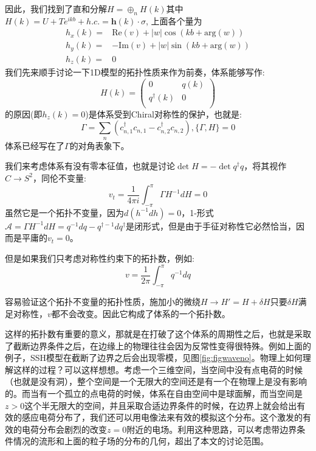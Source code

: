 \documentclass[supercite]{HustGraduPaper}
\begin{document}
因此，我们找到了直和分解$H = \oplus_n H(k)$其中 $H(k) = U + Te^{ikb} + h.c. = \mathbf{h}(k) \cdot \sigma$,
上面各个量为
\begin{equation}
\begin{split}h_x(k)=&\text{Re}(v)+|w|\cos(kb+\text{arg}(w))\\
h_y(k)=&-\text{Im}(v)+|w|\sin(kb+\text{arg}(w))\\
h_z(k)=&0\end{split}
\end{equation}
我们先来顺手讨论一下1D模型的拓扑性质来作为前奏，体系能够写作:
\begin{equation}
H(k) = \left(\begin{matrix}
0 &q(k)\\
q^\dagger(k) & 0\\
\end{matrix}\right)
\end{equation}
的原因(即$h_z(k) = 0$)是体系受到Chiral对称性的保护，也就是:
\begin{equation}
\Gamma = \sum_n(c^\dagger_{n,1}c_{n,1} -c^\dagger_{n,2}c_{n,2}), \{\Gamma,H\} = 0
\end{equation}
体系已经写在了$\Gamma$的对角表象下。

我们来考虑体系有没有零本征值，也就是讨论${\det} H =- \det q^\dagger q$，将其视作$C\to S^2$，同伦不变量:
\begin{equation}
v_t = \frac{1}{4\pi i} \int_{-\pi}^{\pi} \Gamma H^{-1} dH = 0
\end{equation}
虽然它是一个拓扑不变量，因为$d(h^{-1}dh) = 0$，1-形式$\mathcal{A} = \Gamma H^{-1} dH = q^{-1} dq - q^{\dagger -1}dq^\dagger$是闭形式，但是由于手征对称性它必然恰当，因而是平庸的$v_t = 0$。

但是如果我们只考虑对称性约束下的拓扑数\cite{asboth2016short}，例如:
\begin{equation}
v = \frac{1}{2\pi} \int_{-\pi}^\pi q^{-1}dq
\end{equation}

容易验证这个拓扑不变量的拓扑性质，施加小的微绕$H \to H' = H + \delta H$只要$\delta H$满足对称性，$v$都不会改变。因此它构成了体系的一个拓扑数。

这样的拓扑数有重要的意义，那就是在打破了这个体系的周期性之后，也就是采取了截断边界条件之后，在边缘上的物理往往会因为反常性变得很特殊。例如上面的例子，SSH模型在截断了边界之后会出现零模，见图\ref{fig:figwaveno}。物理上如何理解这样的过程？可以这样想想。考虑一个三维空间，当空间中没有点电荷的时候（也就是没有洞），整个空间是一个无限大的空间还是有一个在物理上是没有影响的。而当有一个孤立的点电荷的时候，体系在自由空间中是球面解，而当空间是$z>0$这个半无限大的空间，并且采取合适边界条件的时候，在边界上就会给出有效的感应电荷分布了，我们还可以用电像法来有效的模拟这个分布。这个激发的有效的电荷分布会剧烈的改变$z = 0$附近的电场。利用这种思路，可以考虑带边界条件情况的流形和上面的粒子场的分布的几何，超出了本文的讨论范围。
\end{document}

